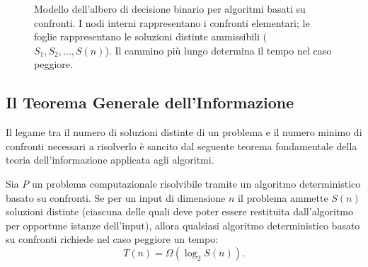 \begin{figure}[H]
  \caption{Modello dell'albero di decisione binario per algoritmi basati su confronti. I nodi interni rappresentano i confronti elementari; le foglie rappresentano le soluzioni distinte ammissibili ($S_1, S_2, \dots, S(n)$). Il cammino più lungo determina il tempo nel caso peggiore.}
  \label{fig:decision-tree-model}
\end{figure}

\subsection{Il Teorema Generale dell'Informazione}
\label{subsec:general-information-theorem}

Il legame tra il numero di soluzioni distinte di un problema e il numero minimo di confronti necessari a risolverlo è sancito dal seguente teorema fondamentale della teoria dell'informazione applicata agli algoritmi.

\begin{theorem}
\label{thm:information-theoretic-bound}
Sia $P$ un problema computazionale risolvibile tramite un algoritmo deterministico basato su confronti. Se per un input di dimensione $n$ il problema ammette $S(n)$ soluzioni distinte (ciascuna delle quali deve poter essere restituita dall'algoritmo per opportune istanze dell'input), allora qualsiasi algoritmo deterministico basato su confronti richiede nel caso peggiore un tempo:
\begin{equation}
  T(n) = \Omega(\log_2 S(n)).
\end{equation}
\end{theorem}


